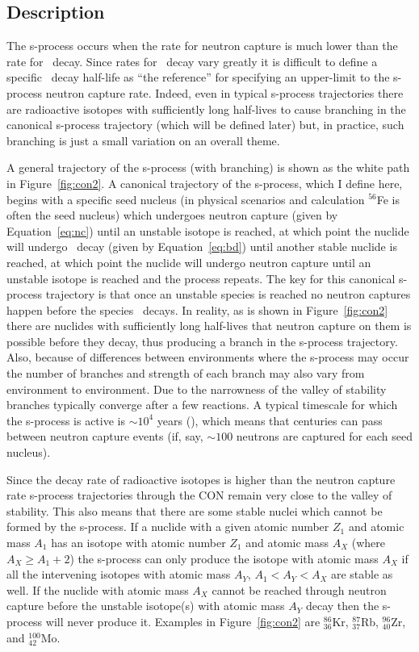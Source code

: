\label{sec:s}
\subsection{Description}
The s-process occurs when
the rate for neutron capture is much lower than the rate
for \bminus\ decay.  Since rates for \bminus\ decay vary greatly
it is difficult to define a specific \bminus\ decay half-life as ``the
reference'' for specifying an upper-limit to the s-process neutron
capture rate.  Indeed, even in typical
s-process trajectories there are radioactive isotopes with
sufficiently long half-lives to cause branching in the canonical s-process
trajectory (which will be defined later) but, in practice, such
branching is just a small variation on an overall theme.  

A general trajectory of the s-process (with branching) is shown as the white path in Figure~\ref{fig:con2}.  A
canonical trajectory of the s-process, which I define here, begins with a specific seed
nucleus (in physical scenarios and calculation $^{56}$Fe is often the
seed nucleus) which undergoes neutron capture (given by
Equation~\ref{eq:nc}) until an unstable isotope is reached, at which
point the nuclide will undergo \bminus\ decay (given by
Equation~\ref{eq:bd}) until another stable nuclide is reached, at
which point the nuclide will undergo neutron capture until an unstable
isotope is reached and the process repeats.  The key for this
canonical s-process trajectory is that once an unstable species is
reached no neutron captures happen before the species \bminus\
decays.  In reality, as is shown in Figure~\ref{fig:con2} there
are nuclides with sufficiently long half-lives that neutron capture on
them is possible before they decay, thus producing a branch in the
s-process trajectory.  Also, because of differences between
environments where the s-process may occur the number of branches and
strength of each branch may also vary from environment to
environment.  Due to the narrowness of the valley of stability
branches typically converge after a few reactions.  A typical timescale
for which the s-process is active is $\sim 10^4$ years
(\citealt{ryan2010}), which means that centuries can pass
between neutron capture events (if, say, $\sim100$ neutrons are
captured for each seed nucleus).

Since the decay rate of radioactive isotopes is higher than the
neutron capture rate s-process trajectories through the CON
remain very close to the valley of stability.  This also
means that there are some stable nuclei which cannot be formed by the
s-process.  If a nuclide with a given atomic number $Z_1$ and atomic
mass $A_1$ has an isotope with atomic number $Z_1$ and atomic mass
$A_X$ (where $A_X \geq A_1 +2$) the s-process can only produce the
isotope with atomic mass $A_X$ if all the intervening isotopes with
atomic mass $A_Y$, $A_1 < A_Y < A_X$ are stable as well.  If the
nuclide with atomic mass $A_X$ cannot be reached through neutron
capture before the unstable isotope(s) with atomic mass $A_Y$ decay
then the s-process will never produce it. Examples in
Figure~\ref{fig:con2} are $^{86}_{36}$Kr,  $^{87}_{37}$Rb,
$^{96}_{40}$Zr, and 
$^{100}_{42}$Mo.


